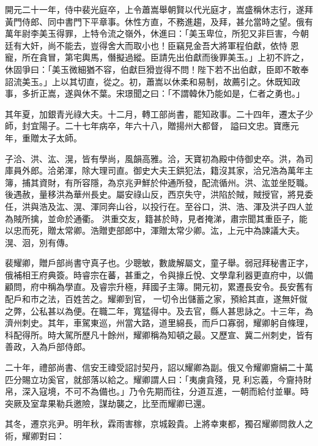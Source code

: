 \begin{pinyinscope}
 開元二十一年，侍中裴光庭卒，上令蕭嵩舉朝賢以代光庭才，嵩盛稱休志行，遂拜黃門侍郎、同中書門下平章事。休性方直，不務進趨，及拜，甚允當時之望。俄有萬年尉李美玉得罪，上特令流之嶺外，休進曰：「美玉卑位，所犯又非巨害，今朝廷有大奸，尚不能去，豈得舍大而取小也！臣竊見金吾大將軍程伯獻，依恃
 恩寵，所在貪冒，第宅輿馬，僭擬過縱。臣請先出伯獻而後罪美玉。」上初不許之，休固爭曰：「美玉微細猶不容，伯獻巨猾豈得不問！陛下若不出伯獻，臣即不敢奉詔流美玉。」上以其切直，從之。初，蕭嵩以休柔和易制，故薦引之。休既知政事，多折正嵩，遂與休不葉。宋璟聞之曰：「不謂韓休乃能如是，仁者之勇也。」



 其年夏，加銀青光祿大夫。十二月，轉工部尚書，罷知政事。二十四年，遷太子少師，封宜陽子。二十七年病卒，年六十八，贈揚州大都督，
 謚曰文忠。寶應元年，重贈太子太師。



 子洽、洪、汯、滉，皆有學尚，風韻高雅。洽，天寶初為殿中侍御史卒。洪，為司庫員外郎。洽弟渾，除大理司直。御史大夫王鉷犯法，籍沒其家，洽兄浩為萬年主簿，捕其資財，有所容隱，為京兆尹鮮於仲通所發，配流循州。洪、汯並坐貶職。後遇赦，量移洪為華州長史。屬安祿山反，西京失守，洪陷於賊，賊授官，將見委任，洪與浩及汯、滉、渾同奔山谷，以投行在。至谷口，洪、浩、渾及洪子四人並為賊所擒，並命於通衢。
 洪重交友，籍甚於時，見者掩涕，肅宗聞其重臣子，能以忠而死，贈太常卿。浩贈吏部郎中，渾贈太常少卿。汯，上元中為諫議大夫。滉、洄，別有傳。



 裴耀卿，贈戶部尚書守真子也。少聰敏，數歲解屬文，童子舉。弱冠拜秘書正字，俄補相王府典簽。時睿宗在蕃，甚重之，令與掾丘悅、文學韋利器更直府中，以備顧問，府中稱為學直。及睿宗升極，拜國子主簿。開元初，累遷長安令。長安舊有配戶和市之法，百姓苦之。耀卿到官，
 一切令出儲蓄之家，預給其直，遂無奸僦之弊，公私甚以為便。在職二年，寬猛得中。及去官，縣人甚思詠之。十三年，為濟州刺史。其年，車駕東巡，州當大路，道里綿長，而戶口寡弱，耀卿躬自條理，科配得所。時大駕所歷凡十餘州，耀卿稱為知頓之最。又歷宣、冀二州刺史，皆有善政，入為戶部侍郎。



 二十年，禮部尚書、信安王禕受詔討契丹，詔以耀卿為副。俄又令耀卿齎絹二十萬匹分賜立功奚官，就部落以給之。耀卿謂人曰：「夷虜貪殘，見
 利忘義，今齎持財帛，深入寇境，不可不為備也。」乃令先期而往，分道互進，一朝而給付並畢。時突厥及室韋果勒兵邀險，謀劫襲之，比至而耀卿已還。



 其冬，遷京兆尹。明年秋，霖雨害稼，京城穀貴。上將幸東都，獨召耀卿問救人之術，耀卿對曰：




\end{pinyinscope}
